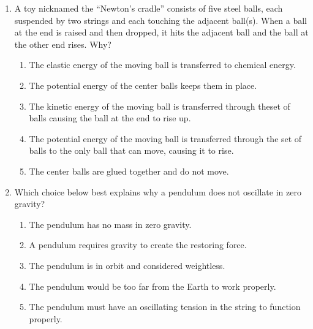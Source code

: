 \documentclass{../../../oss-apphys}
\begin{document}
\begin{multicols}{2}
\begin{enumerate}[leftmargin=18pt]
  \item  A toy nicknamed the ``Newton’s cradle'' consists of five steel balls,
    each suspended by two strings and each touching the adjacent ball(s).
    When a ball at the end is raised and then dropped, it hits the adjacent
    ball and the ball at the other end rises. Why?
    \begin{enumerate}[noitemsep,topsep=0pt,leftmargin=18pt,label=(\Alph*)]
    \item The elastic energy of the moving ball is transferred to chemical
      energy.
    \item The potential energy of the center balls keeps them in place.
    \item The kinetic energy of the moving ball is transferred through theset
      of balls causing the ball at the end to rise up.
    \item The potential energy of the moving ball is transferred through the
      set of balls to the only ball that can move, causing it to rise.
    \item The center balls are glued together and do not move.
    \end{enumerate}
    \vspace{.7in}
    
  \item Which choice below best explains why a pendulum does not oscillate
    in zero gravity?
    \begin{enumerate}[nosep,leftmargin=18pt,label=(\Alph*)]
    \item The pendulum has no mass in zero gravity.
    \item A pendulum requires gravity to create the restoring force.
    \item The pendulum is in orbit and considered weightless.
    \item The pendulum would be too far from the Earth to work properly.
    \item The pendulum must have an oscillating tension in the string to
      function properly.
    \end{enumerate}
    \vspace{.7in}
    


\end{enumerate}
\end{multicols}
\end{document}
